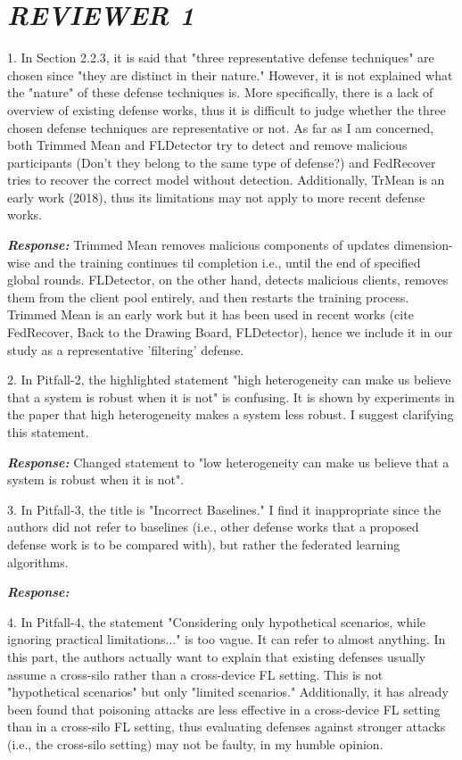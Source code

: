 \section{\textit{\textbf{REVIEWER 1}
}}

1. In Section 2.2.3, it is said that "three representative defense techniques" are chosen since "they are distinct in their nature." However, it is not explained what the "nature" of these defense techniques is. More specifically, there is a lack of overview of existing defense works, thus it is difficult to judge whether the three chosen defense techniques are representative or not. As far as I am concerned, both Trimmed Mean and FLDetector try to detect and remove malicious participants (Don't they belong to the same type of defense?) and FedRecover tries to recover the correct model without detection. Additionally, TrMean is an early work (2018), thus its limitations may not apply to more recent defense works.

\textbf{\textit{Response:}}
Trimmed Mean removes malicious components of updates dimension-wise and the training continues til completion i.e., until the end of specified global rounds. FLDetector, on the other hand, detects malicious clients, removes them from the client pool entirely, and then restarts the training process.
Trimmed Mean is an early work but it has been used in recent works (cite FedRecover, Back to the Drawing Board,  FLDetector), hence we include it in our study as a representative 'filtering' defense.

2. In Pitfall-2, the highlighted statement "high heterogeneity can make us believe that a system is robust when it is not" is confusing. It is shown by experiments in the paper that high heterogeneity makes a system less robust. I suggest clarifying this statement.

\textbf{\textit{Response:}}
Changed statement to "low heterogeneity can make us believe that a system is robust when it is not".

3. In Pitfall-3, the title is "Incorrect Baselines." I find it inappropriate since the authors did not refer to baselines (i.e., other defense works that a proposed defense work is to be compared with), but rather the federated learning algorithms.

\textbf{\textit{Response:}}

4. In Pitfall-4, the statement "Considering only hypothetical scenarios, while ignoring practical limitations..." is too vague. It can refer to almost anything. In this part, the authors actually want to explain that existing defenses usually assume a cross-silo rather than a cross-device FL setting. This is not "hypothetical scenarios" but only "limited scenarios." Additionally, it has already been found that poisoning attacks are less effective in a cross-device FL setting than in a cross-silo FL setting, thus evaluating defenses against stronger attacks (i.e., the cross-silo setting) may not be faulty, in my humble opinion.

